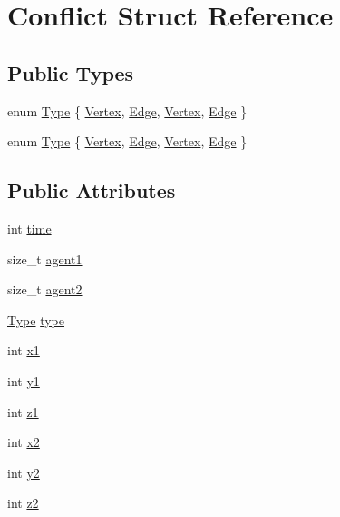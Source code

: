 \hypertarget{struct_conflict}{}\section{Conflict Struct Reference}
\label{struct_conflict}
\subsection*{Public Types}
\begin{DoxyCompactItemize}
\item 
enum \hyperlink{struct_conflict_aee4228c4b31f415064213a2bbebe3eb6}{Type} \{ \hyperlink{struct_conflict_aee4228c4b31f415064213a2bbebe3eb6ab8d89ab66862b11dc349e54eddbe1228}{Vertex}, 
\hyperlink{struct_conflict_aee4228c4b31f415064213a2bbebe3eb6a26aa4d7e034987c2d348684b8a3dfdca}{Edge}, 
\hyperlink{struct_conflict_aee4228c4b31f415064213a2bbebe3eb6ab8d89ab66862b11dc349e54eddbe1228}{Vertex}, 
\hyperlink{struct_conflict_aee4228c4b31f415064213a2bbebe3eb6a26aa4d7e034987c2d348684b8a3dfdca}{Edge}
 \}
\item 
enum \hyperlink{struct_conflict_aee4228c4b31f415064213a2bbebe3eb6}{Type} \{ \hyperlink{struct_conflict_aee4228c4b31f415064213a2bbebe3eb6ab8d89ab66862b11dc349e54eddbe1228}{Vertex}, 
\hyperlink{struct_conflict_aee4228c4b31f415064213a2bbebe3eb6a26aa4d7e034987c2d348684b8a3dfdca}{Edge}, 
\hyperlink{struct_conflict_aee4228c4b31f415064213a2bbebe3eb6ab8d89ab66862b11dc349e54eddbe1228}{Vertex}, 
\hyperlink{struct_conflict_aee4228c4b31f415064213a2bbebe3eb6a26aa4d7e034987c2d348684b8a3dfdca}{Edge}
 \}
\end{DoxyCompactItemize}
\subsection*{Public Attributes}
\begin{DoxyCompactItemize}
\item 
int \hyperlink{struct_conflict_a1c5e5967fe6b6f20a67910df06a4133f}{time}
\item 
size\+\_\+t \hyperlink{struct_conflict_a202c78783691564fb2a576d1bd6fe0b5}{agent1}
\item 
size\+\_\+t \hyperlink{struct_conflict_ad8ecb104ed7c27c703e26187d96defa6}{agent2}
\item 
\hyperlink{struct_conflict_aee4228c4b31f415064213a2bbebe3eb6}{Type} \hyperlink{struct_conflict_acf201248af61ee8fad8e1e806df12172}{type}
\item 
int \hyperlink{struct_conflict_a9a1d3928989b17b8c5785a6d7fd335fa}{x1}
\item 
int \hyperlink{struct_conflict_a48f6033f035b152132cbbc0081a9216b}{y1}
\item 
int \hyperlink{struct_conflict_ab5d52bb95d71415d8154c0d9271b703c}{z1}
\item 
int \hyperlink{struct_conflict_a8a31ca7b4e951e2fc111def844b81d7e}{x2}
\item 
int \hyperlink{struct_conflict_aa0406a6a50889d8c1803b6ec11c21230}{y2}
\item 
int \hyperlink{struct_conflict_afd42fecf78db0ec2a73bc9eadc554960}{z2}
\end{DoxyCompactItemize}

